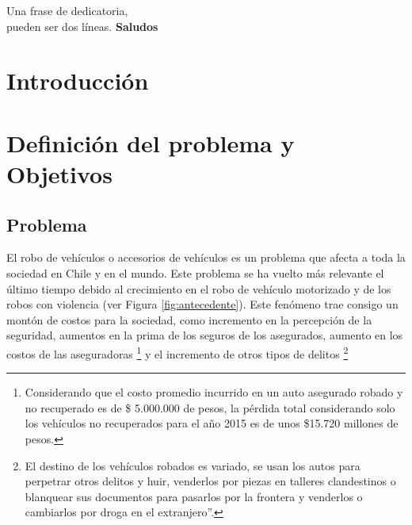 \documentclass[letterpaper,12pt,oneside]{book} %
\begin{document}



\newcommand{\quotes}[1]{``#1''}

\begin{dedicatoria}
	Una frase de dedicatoria, \\
	pueden ser dos líneas. \newp
	\textbf{Saludos}
\end{dedicatoria}

\begin{agradecimientos}
	\lipsum[1]
\end{agradecimientos}



\begin{resumen}
	\lipsum[1]
\end{resumen}


\hypersetup{
    citecolor=Blue
}
\chapter{Introducción}

\chapter{Definición del problema y Objetivos}
\section{Problema}
El robo de vehículos o accesorios de vehículos es un problema que afecta a toda la sociedad en Chile y en el mundo. Este problema se ha vuelto más relevante el último tiempo debido al crecimiento en el robo de vehículo motorizado y de los robos con violencia (ver Figura \ref{fig:antecedente}). Este fenómeno trae consigo un montón de costos para la sociedad, como incremento en la percepción de la seguridad, aumentos en la prima de los seguros de los asegurados, aumento en los costos de las aseguradoras \footnote{Considerando que el costo promedio incurrido en un auto asegurado robado y no recuperado es de \$ 5.000.000 de pesos, la pérdida total considerando solo los vehículos no recuperados para el año 2015 es de unos \$15.720 millones de pesos.} y el incremento de otros tipos de delitos \footnote{El destino de los vehículos robados es variado, se usan los autos para perpetrar otros delitos y huir, venderlos por piezas en talleres clandestinos o blanquear sus documentos para pasarlos por la frontera y venderlos o cambiarlos por droga en el extranjero''.} 
\end{document}
